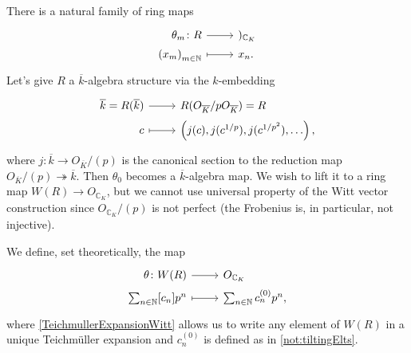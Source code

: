 \begin{rem}[]
	There is a natural family of ring maps
	\begin{equation*}
	\begin{tikzcd}[row sep = 0ex
		,/tikz/column 1/.append style={anchor=base east}
		,/tikz/column 2/.append style={anchor=base west}]
		\theta_m\colon R \arrow[r, "", rightarrow] &
		)_{\mathbb{C}_K} \\
		\left( x_m \right)_{m \in \mathbb{N}} \arrow[r, "", mapsto] & 
		x_n
	.\end{tikzcd}
	\end{equation*} 
	Let's give $R$ a $\overline{k}$-algebra structure
	via the $k$-embedding
	\begin{equation*}
	\begin{tikzcd}[row sep = 0ex
		,/tikz/column 1/.append style={anchor=base east}
		,/tikz/column 2/.append style={anchor=base west}]
		\overline{k} = R(\overline{k}) \arrow[r, "", rightarrow] &
		R(O_{\overline{K}}/pO_{\overline{K}}) =R\\
		c \arrow[r, "", mapsto] & 
		\left( j(c), j(c^{1/p}), j(c^{1/p^2}), \ldots \right)
	,\end{tikzcd}
	\end{equation*} 
	where $j\colon \overline{k} \to O_{\overline{K}}/ (p)$ is the canonical
	section to the reduction map $O_{\overline{K}}/ (p) \twoheadrightarrow \overline{k}$.
	Then $\theta_0$ becomes a $\overline{k}$-algebra map.
	We wish to lift it to a ring map $W(R) \to O_{\mathbb{C}_K}$,
	but we cannot use universal property of the Witt vector construction
	since $O_{\mathbb{C}_K}/ (p)$ is not perfect (the Frobenius is,
	in particular, not injective).
\end{rem}


\begin{defn}[]
	We define, set theoretically, the map
	\begin{equation*}
	\begin{tikzcd}[row sep = 0ex
		,/tikz/column 1/.append style={anchor=base east}
		,/tikz/column 2/.append style={anchor=base west}]
		\theta\colon W(R) \arrow[r, "", rightarrow] &
		O_{\mathbb{C}_K} \\
		\sum_{n \in \mathbb{N} }^{  } [c_n] p^n \arrow[r, "", mapsto] & 
		\sum_{n \in \mathbb{N} }^{  } c_n^{(0)} p^n
	,\end{tikzcd}
	\end{equation*} 
	where \cref{TeichmullerExpansionWitt} allows us to write any element of $W(R)$
	in a unique Teichmüller expansion and $c_n^{(0)}$ is defined as in \cref{not:tiltingElts}.
\end{defn}


